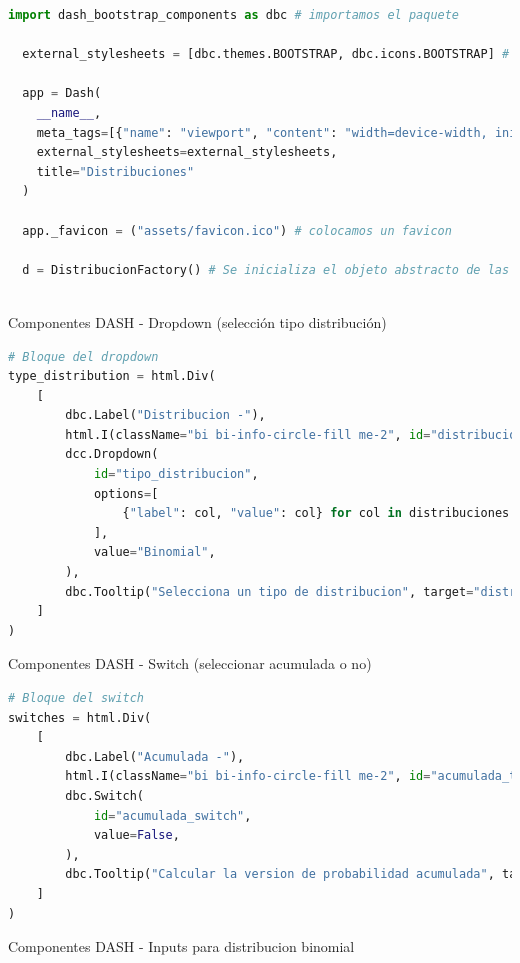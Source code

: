 \documentclass[
	12pt, %
]{fphw}
\begin{document}
\begin{lstlisting}[language=Python, caption=Configuración Dash]
  import dash_bootstrap_components as dbc # importamos el paquete

  external_stylesheets = [dbc.themes.BOOTSTRAP, dbc.icons.BOOTSTRAP] # configuramos que tome los estilos de bootstrap asi como los iconos

  app = Dash(
    __name__,
    meta_tags=[{"name": "viewport", "content": "width=device-width, initial-scale=1"}],
    external_stylesheets=external_stylesheets,
    title="Distribuciones"
  )

  app._favicon = ("assets/favicon.ico") # colocamos un favicon

  d = DistribucionFactory() # Se inicializa el objeto abstracto de las distribuciones
  
\end{lstlisting}

{\color{teal}
  \dotfill
  Componentes DASH - Dropdown (selección tipo distribución)
  \dotfill}

\begin{lstlisting}[language=Python]
# Bloque del dropdown                                                                                      
type_distribution = html.Div(
    [
        dbc.Label("Distribucion -"),
        html.I(className="bi bi-info-circle-fill me-2", id="distribucion_tooltip"),
        dcc.Dropdown(
            id="tipo_distribucion",
            options=[
                {"label": col, "value": col} for col in distribuciones
            ],
            value="Binomial",
        ),
        dbc.Tooltip("Selecciona un tipo de distribucion", target="distribucion_tooltip")
    ]
)
\end{lstlisting}
\newpage
{\color{teal}
  \dotfill
  Componentes DASH - Switch (seleccionar acumulada o no)
  \dotfill}

\begin{lstlisting}[language=Python]
# Bloque del switch                                                                                        
switches = html.Div(
    [
        dbc.Label("Acumulada -"),
        html.I(className="bi bi-info-circle-fill me-2", id="acumulada_tooltip"),
        dbc.Switch(
            id="acumulada_switch",
            value=False,
        ),
        dbc.Tooltip("Calcular la version de probabilidad acumulada", target="acumulada_tooltip")
    ]
)
\end{lstlisting}

{\color{teal}
  \dotfill
  Componentes DASH - Inputs para distribucion binomial
  \dotfill}
\end{document}
